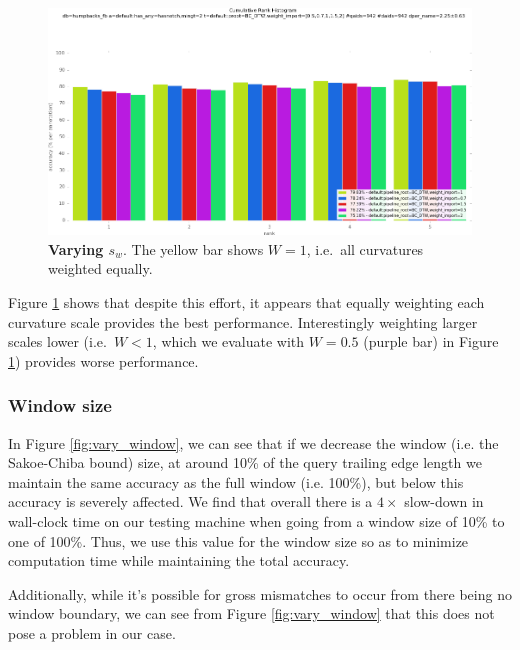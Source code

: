 \begin{figure}[t]%
\centering
\includegraphics[width=1\textwidth]{../images/results/vary_weight_import.png}
\caption{\textbf{Varying $s_w$}. The yellow bar shows $W = 1$, i.e.\ all curvatures weighted equally.}
\label{fig:vary_weight_import}
\end{figure}



Figure \ref{fig:vary_weight_import} shows that despite this effort, it appears that equally weighting each curvature scale provides the best performance.
Interestingly weighting larger scales lower (i.e.\ $W < 1$, which we evaluate with $W = 0.5$ (purple bar) in Figure \ref{fig:vary_weight_import}) provides worse performance.

\subsubsection{Window size}

In Figure \ref{fig:vary_window}, we can see that if we decrease the window (i.e. the Sakoe-Chiba bound) size, at around 10\% of the query trailing edge length we maintain the same accuracy as the full window (i.e. 100\%), but below this accuracy is severely affected.
We find that overall there is a $4\times$ slow-down in wall-clock time on our testing machine when going from a window size of 10\% to one of 100\%. 
Thus, we use this value for the window size so as to minimize computation time while maintaining the total accuracy.

Additionally, while it's possible for gross mismatches to occur from there being no window boundary, we can see from Figure \ref{fig:vary_window} that this does not pose a problem in our case.

